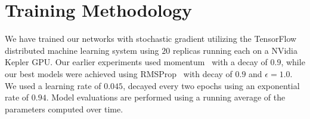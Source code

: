 \section{Training Methodology}
We have trained our networks with stochastic gradient utilizing the
TensorFlow~\cite{tensorflow2015-whitepaper} distributed machine learning system
using $20$ replicas running each on a NVidia Kepler GPU.
Our earlier experiments used momentum~\cite{icml2013_sutskever13} with a
decay of $0.9$, while our best models were achieved using RMSProp~\cite{rmsprop}
with decay of $0.9$ and $\epsilon=1.0$. We used a learning rate of $0.045$,
decayed every two epochs using an exponential rate of $0.94$.
Model evaluations are performed using a running average of the parameters
computed over time.
